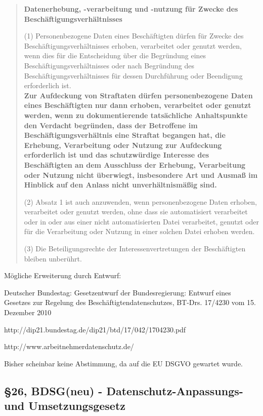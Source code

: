   \begin{quotation}
  
  \textbf{Datenerhebung, -verarbeitung und -nutzung für Zwecke des Beschäftigungsverhältnisses}
  
  (1) Personenbezogene Daten eines Beschäftigten dürfen für Zwecke des Beschäftigungsverhältnisses erhoben, verarbeitet oder genutzt werden, wenn dies für die Entscheidung über die Begründung eines Beschäftigungsverhältnisses oder nach Begründung des Beschäftigungsverhältnisses für dessen Durchführung oder Beendigung erforderlich ist. \\
  \textbf{Zur Aufdeckung von Straftaten dürfen personenbezogene Daten eines Beschäftigten nur dann erhoben, verarbeitet oder genutzt werden, wenn zu dokumentierende tatsächliche Anhaltspunkte den Verdacht begründen, dass der Betroffene im Beschäftigungsverhältnis eine Straftat begangen hat, die Erhebung, Verarbeitung oder Nutzung zur Aufdeckung erforderlich ist und das schutzwürdige Interesse des Beschäftigten an dem Ausschluss der Erhebung, Verarbeitung oder Nutzung nicht überwiegt, insbesondere Art und Ausmaß im Hinblick auf den Anlass nicht unverhältnismäßig sind.}
  
  (2) Absatz 1 ist auch anzuwenden, wenn personenbezogene Daten erhoben, verarbeitet oder genutzt werden, ohne dass sie automatisiert verarbeitet oder in oder aus einer nicht automatisierten Datei verarbeitet, genutzt oder für die Verarbeitung oder Nutzung in einer solchen Datei erhoben werden.
  
  (3) Die Beteiligungsrechte der Interessenvertretungen der Beschäftigten bleiben unberührt.
  
  \end{quotation}
  
  Mögliche Erweiterung durch Entwurf:

  Deutscher Bundestag: Gesetzentwurf der Bundesregierung: Entwurf eines Gesetzes zur Regelung des Beschäftigtendatenschutzes, BT-Drs. 17/4230 vom 15. Dezember 2010
  
  http://dip21.bundestag.de/dip21/btd/17/042/1704230.pdf
  
  http://www.arbeitnehmerdatenschutz.de/
  
  Bisher scheinbar keine Abstimmung, da auf die EU DSGVO gewartet wurde.
  
  \subsection*{§26, BDSG(neu) - Datenschutz-Anpassungs- und Umsetzungsgesetz} 

